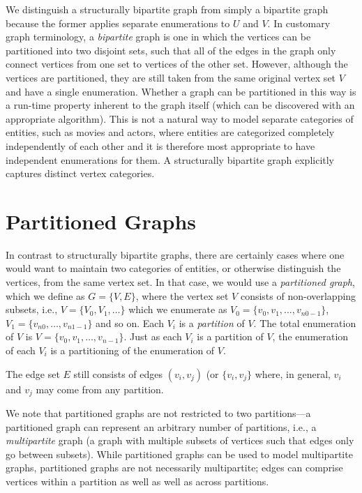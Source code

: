 We distinguish a structurally bipartite graph from simply a bipartite graph because the former applies separate enumerations to $U$ and $V$.  
In customary graph terminology, a \emph{bipartite} graph is one in which the vertices can be partitioned into two disjoint sets, such that all of the edges in the graph only connect vertices from one set to vertices of the other set.  However, although the vertices are partitioned, they are still taken from the same original vertex set $V$ and have a single enumeration.
Whether a graph can be partitioned in this way is a run-time property inherent to the graph itself (which can be discovered with an appropriate algorithm).  
This is not a natural way to model separate categories of entities, such as movies and actors, where entities are categorized completely independently of each other and it is therefore most appropriate to have independent enumerations for them.  
A structurally bipartite graph explicitly captures distinct vertex categories.
%

\section{Partitioned Graphs}

In contrast to structurally bipartite graphs, there are certainly cases
where one would want to maintain two categories of entities, or otherwise distinguish the vertices, from the same vertex set.  In that case, we would use a \emph{partitioned graph}, which we define as
$G = \{ V, E \}$, where the vertex set $V$ consists of non-overlapping subsets, i.e.,
$V = \{ V_0, V_1, \ldots \}$ which we enumerate as $V_0 = \{v_0, v_1, \ldots , v_{n0-1} \}$, 
$V_1 = \{ v_{n0}, \ldots , v_{n1-1} \}$ and so on.  Each $V_i$ is a \emph{partition} of $V$.
The total enumeration of $V$ is $V= \{ v_0, v_1, \ldots , v_{n-1} \}$.  Just as each $V_i$ is a partition of $V$, the enumeration of each $V_i$ is a partitioning of the enumeration of $V$.

The edge set $E$ still consists of edges $(v_i, v_j)$ (or $\{v_i, v_j\}$ where, in general, $v_i$ and $v_j$ may come from any partition.

We note that partitioned graphs are not restricted to two partitions---a partitioned graph can represent an arbitrary number of partitions, i.e., a \emph{multipartite} graph (a graph with multiple subsets of vertices such that edges only go between subsets).
While partitioned graphs can be used to model multipartite graphs, partitioned graphs are not necessarily multipartite; edges can comprise vertices within a partition as well as well as across partitions.


